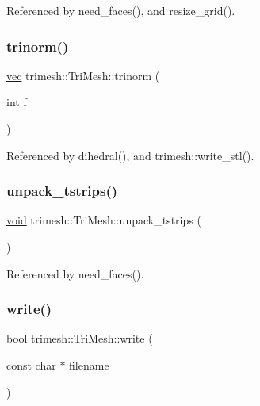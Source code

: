 Referenced by need\+\_\+faces(), and resize\+\_\+grid().

\mbox{\label{classtrimesh_1_1TriMesh_a05cd0934d0e6de50a259f543f28b9d3e}} 
\subsubsection{\texorpdfstring{trinorm()}{trinorm()}}
{\footnotesize\ttfamily \hyperlink{namespacetrimesh_a4fc2b83feba99c931f837a0c7d4b4df1}{vec} trimesh\+::\+Tri\+Mesh\+::trinorm (\begin{DoxyParamCaption}\item[{int}]{f }\end{DoxyParamCaption})\hspace{0.3cm}{\ttfamily [inline]}}



Referenced by dihedral(), and trimesh\+::write\+\_\+stl().

\mbox{\label{classtrimesh_1_1TriMesh_ae869c05ddc0526527a6c792c93140de6}} 
\subsubsection{\texorpdfstring{unpack\+\_\+tstrips()}{unpack\_tstrips()}}
{\footnotesize\ttfamily \hyperlink{namespacetrimesh_a784ddfd979e1c579bda795a8edfc3f43}{void} trimesh\+::\+Tri\+Mesh\+::unpack\+\_\+tstrips (\begin{DoxyParamCaption}{ }\end{DoxyParamCaption})}



Referenced by need\+\_\+faces().

\mbox{\label{classtrimesh_1_1TriMesh_a2c99b75b0ccedd7a9ea91e6f7350f390}} 
\subsubsection{\texorpdfstring{write()}{write()}\hspace{0.1cm}{\footnotesize\ttfamily [1/2]}}
{\footnotesize\ttfamily bool trimesh\+::\+Tri\+Mesh\+::write (\begin{DoxyParamCaption}\item[{const char $\ast$}]{filename }\end{DoxyParamCaption})}




